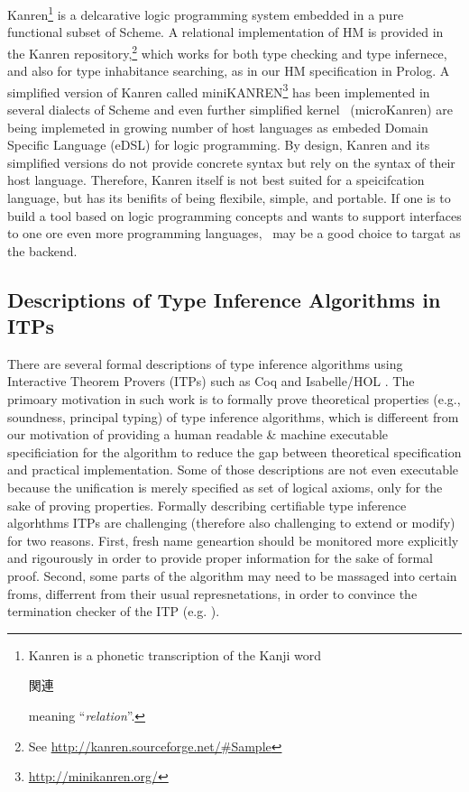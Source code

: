 Kanren\footnote{Kanren is a phonetic transcription of the Kanji word
	\begin{CJK}{UTF8}{min}{関連}\end{CJK} meaning ``\emph{relation}''.}
is a delcarative logic programming system embedded in a pure functional subset of
Scheme. A relational implementation of HM is provided in
the Kanren repository,\footnote{See \url{http://kanren.sourceforge.net/\#Sample}}
which works for both type checking and type infernece, and also for
type inhabitance searching, as in our HM specification in Prolog.
A simplified version of Kanren called miniKANREN\footnote{
	\url{http://minikanren.org/} } has been implemented in several dialects
of Scheme and even further simplified kernel \muKanren\ (microKanren)
\cite{microKanren} are being implemeted in growing number of host languages as
embeded Domain Specific Language (eDSL) for logic programming. By design, Kanren
and its simplified versions do not provide concrete syntax but rely on the syntax
of their host language. Therefore, Kanren itself is not best suited for
a speicifcation language, but has its benifits of being flexibile, simple, and
portable. If one is to build a tool based on logic programming concepts and wants
to support interfaces to one ore even more programming languages, \muKanren\ may
be a good choice to targat as the backend.

\subsection{Descriptions of Type Inference Algorithms in ITPs}
There are several formal descriptions of type inference algorithms using
Interactive Theorem Provers (ITPs) such as Coq \cite{Dubois00} and
Isabelle/HOL \cite{NaraschewskiN-JAR,UrbanN2009}. The primoary motivation
in such work is to formally prove theoretical properties (e.g., soundness,
principal typing) of type inference algorithms, which is differeent from
our motivation of providing a human readable \& machine executable
specificiation for the algorithm to reduce the gap between
theoretical specification and practical implementation. Some of those
descriptions  are not even executable because the unification is merely
specified as set of logical axioms, only for the sake of proving properties.
Formally describing certifiable type inference algorhthms ITPs are challenging
(therefore also challenging to extend or modify) for two reasons. First, fresh
name geneartion should be monitored more explicitly and rigourously in order to
provide proper information for the sake of formal proof. Second, some parts of
the algorithm may need to be massaged into certain froms, differrent from their
usual represnetations, in order to convince the termination checker of the ITP
(e.g. \cite{JFP:185139}).

